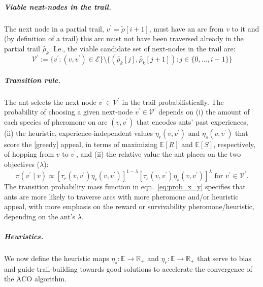 \documentclass[11pt, oneside]{article}
\begin{document}
\subparagraph{Viable next-nodes in the trail.}
The next node in a partial trail, $v^\prime = \tilde{\rho}[i+1]$, must have an arc from $v$ to it and (by definition of a trail) this arc must not have been traversed already in the partial trail $\tilde{\rho_k}$. I.e., the viable candidate set of next-nodes in the trail are:
\begin{equation}
 	\mathcal{V}^\prime := \{ v^\prime : (v, v^\prime ) \in \mathcal{E} \} \setminus \{ (\tilde{\rho_k}[j], \tilde{\rho_k}[j+1]) : j \in \{0,...,i-1\} \}
\end{equation}

\subparagraph{Transition rule.}
The ant selects the next node $v^\prime \in  \mathcal{V}^\prime$ in the trail probabilistically. The probability of choosing a given next-node $v^\prime \in  \mathcal{V}^\prime$ depends on (i) the amount of each species of pheromone on arc $(v, v^\prime)$ that encodes ants' past experiences, (ii) the heuristic, experience-independent values $\eta_r(v, v^\prime)$ and $\eta_s(v, v^\prime)$ that score the [greedy] appeal, in terms of maximizing $\mathbb{E}[R]$ and $\mathbb{E}[S]$, respectively, of hopping from $v$ to $v^\prime$, and (ii) the relative value the ant places on the two objectives ($\lambda$):
\begin{equation}
	\pi(v^\prime \mid v) \propto 
		 \left[\tau_r(v, v^\prime) \eta_r(v, v^\prime) \right]^{1-\lambda} \left[ \tau_s(v, v^\prime) \eta_s(v, v^\prime) \right]^\lambda \text{ for }  v^\prime \in \mathcal{V}^\prime.
	 \label{eq:prob_x_y}
\end{equation}
The transition probability mass function in eqn.~\ref{eq:prob_x_y} specifies that ants are more likely to traverse arcs with more pheromone and/or heuristic appeal, with more emphasis on the reward or survivability pheromone/heuristic, depending on the ant's $\lambda$.

\subparagraph{Heuristics.} We now define the heuristic maps $\eta_s: \mathbb{E} \rightarrow \mathbb{R}_+$ and $\eta_r:  \mathbb{E} \rightarrow \mathbb{R}_+$ that serve to bias and guide trail-building towards good solutions to accelerate the convergence of the ACO algorithm. 
\end{document}

